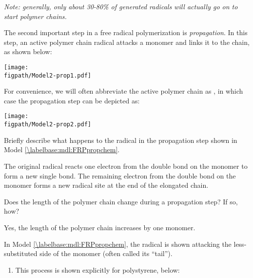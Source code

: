 \begin{activity}
\begin{ctqs}
\begin{solution}[1.25in]
					\emph{Note: generally, only about 30-80\% of generated radicals will actually go on to start polymer chains.}
				\end{solution}

\end{ctqs}



\begin{model}[Propagation]
\label{\labelbase:mdl:FRPpropchem}

	The second important step in a free radical polymerization is \emph{propagation}.  In this step, an active polymer chain radical attacks a monomer and links it to the chain, as shown below:
	
			\centerline{\texttt{[image: \\figpath/Model2-prop1.pdf]}}
	
	For convenience, we will often abbreviate the active polymer chain as , in which case the propagation step can be depicted as:
	
			\centerline{\texttt{[image: \\figpath/Model2-prop2.pdf]}}
	

\end{model}

\begin{ctqs}

	\question Briefly describe what happens to the radical in the propagation step shown in Model \ref{\labelbase:mdl:FRPpropchem}.%
	
		\begin{solution}[1.5in]
			The original radical reacts one electron from the double bond on the monomer to form a new single bond.  The remaining electron from the double bond on the monomer forms a new radical site at the end of the elongated chain.
		\end{solution}
	
	\question Does the length of the polymer chain change during a propagation step?  If so, how?
	
		\begin{solution}[1.2in]
			Yes, the length of the polymer chain increases by one monomer.
		\end{solution}
	
	\question In Model \ref{\labelbase:mdl:FRPpropchem}, the radical is shown attacking the less-substituted side of the monomer (often called its ``tail'').  
	
		\begin{enumerate}
			\item This process is shown explicitly for polystyrene, below:
	

\end{enumerate}
\end{ctqs}
\end{activity}
